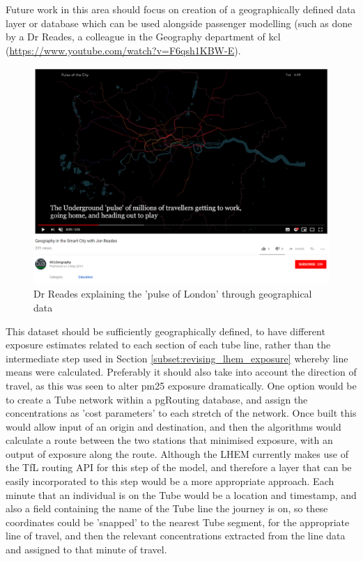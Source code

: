 
Future work in this area should focus on creation of a geographically defined data layer or database which can be used alongside passenger modelling (such as done by a Dr Reades, a colleague in the Geography department of \gls{kcl} (\url{https://www.youtube.com/watch?v=F6qsh1KBW-E}).

\begin{figure}[H]
\centering
\includegraphics[scale=0.4]{images/pulse_of_london.png}
\caption{Dr Reades explaining the 'pulse of London' through geographical data}
\label{fig:pulse_of_london}
\end{figure}

This dataset should be sufficiently geographically defined, to have different exposure estimates related to each section of each tube line, rather than the intermediate step used in Section \ref{subset:revising_lhem_exposure} whereby line means were calculated. Preferably it should also take into account the direction of travel, as this was seen to alter \gls{pm25} exposure dramatically. One option would be to create a Tube network within a pgRouting database, and assign the concentrations as 'cost parameters' to each stretch of the network. Once built this would allow input of an origin and destination, and then the algorithms would calculate a route between the two stations that minimised exposure, with an output of exposure along the route. Although the LHEM currently makes use of the TfL routing API for this step of the model, and therefore a layer that can be easily incorporated to this step would be a more appropriate approach. Each minute that an individual is on the Tube would be a location and timestamp, and also a field containing the name of the Tube line the journey is on, so these coordinates could be 'snapped' to the nearest Tube segment, for the appropriate line of travel, and then the relevant concentrations extracted from the line data and assigned to that minute of travel.

